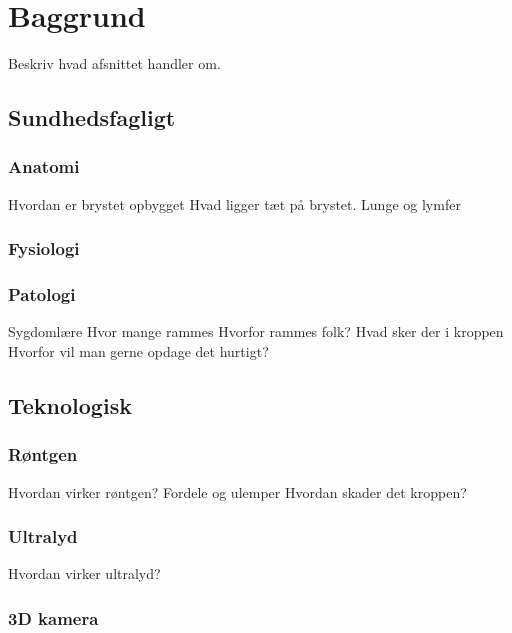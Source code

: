 \chapter{Baggrund}\label{kapitel_Baggrund}
Beskriv hvad afsnittet handler om. 

\section{Sundhedsfagligt}

\subsection{Anatomi}
Hvordan er brystet opbygget
Hvad ligger tæt på brystet. 
Lunge og lymfer
\subsection{Fysiologi}

\subsection{Patologi}
Sygdomlære
Hvor mange rammes
Hvorfor rammes folk?
Hvad sker der i kroppen
Hvorfor vil man gerne opdage det hurtigt?

\section{Teknologisk}
\subsection{Røntgen}
Hvordan virker røntgen?
Fordele og ulemper
Hvordan skader det kroppen? 

\subsection{Ultralyd}
Hvordan virker ultralyd?

\subsection{3D kamera}
